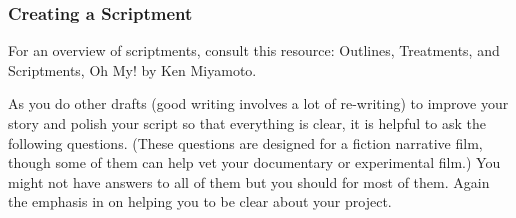\documentclass[
]{book}
\begin{document}
\begin{reflect}
\hypertarget{creating-a-scriptment-1}{%
\subsubsection*{Creating a Scriptment}\label{creating-a-scriptment-1}}

For an overview of scriptments, consult this resource: Outlines, Treatments, and Scriptments, Oh My! by Ken Miyamoto.

As you do other drafts (good writing involves a lot of re-writing) to improve your story and polish your script so that everything is clear, it is helpful to ask the following questions. (These questions are designed for a fiction narrative film, though some of them can help vet your documentary or experimental film.) You might not have answers to all of them but you should for most of them. Again the emphasis in on helping you to be clear about your project.


\end{reflect}
\end{document}
